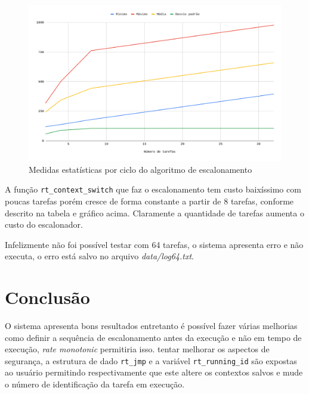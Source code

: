 \documentclass[a4 paper]{article}
\begin{document}
\begin{figure}[htp]
    \centering
    \includegraphics[width=12cm]{graph}
    \caption{Medidas estatísticas por ciclo do algoritmo de escalonamento}
    \label{fig:graph}
\end{figure}


A função \verb|rt_context_switch| que faz o escalonamento tem custo baixíssimo com poucas tarefas porém cresce de forma constante a partir de 8 tarefas, conforme descrito na tabela e gráfico acima. Claramente a quantidade de tarefas aumenta o custo do escalonador. 

Infelizmente não foi possível testar com 64 tarefas, o sistema apresenta erro e não executa, o erro está salvo no arquivo \textit{data/log64.txt}. 

\section{Conclusão}
O sistema apresenta bons resultados entretanto é possível fazer várias melhorias como definir a sequência de escalonamento antes da execução e não em tempo de execução, \textit{rate monotonic} permitiria isso. tentar melhorar os aspectos de segurança, a estrutura de dado  \verb|rt_jmp| e a variável \verb|rt_running_id| são expostas ao usuário permitindo respectivamente que este altere os contextos salvos e mude o número de identificação da tarefa em execução.
\end{document}
